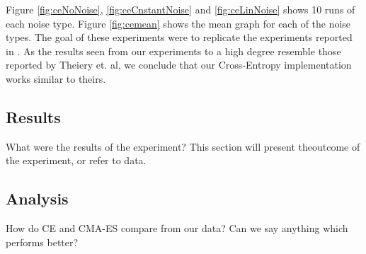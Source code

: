 Figure \ref{fig:ceNoNoise}, \ref{fig:ceCnstantNoise} and
\ref{fig:ceLinNoise} shows 10 runs of each noise type. Figure
\ref{fig:cemean} shows the mean graph for each of the noise types.
The goal of these experiments were to replicate the experiments 
reported in \citep{thiery:09}. As the results seen from our experiments
to a high degree resemble those reported by Theiery et. al, we conclude
that our Cross-Entropy implementation works similar to theirs.
\\

\subsection{Results}

What were the results of the experiment? This section will
present theoutcome of the experiment, or refer to data.

\subsection{Analysis}

How do CE and CMA-ES compare from our data? Can we say anything 
which performs better?

